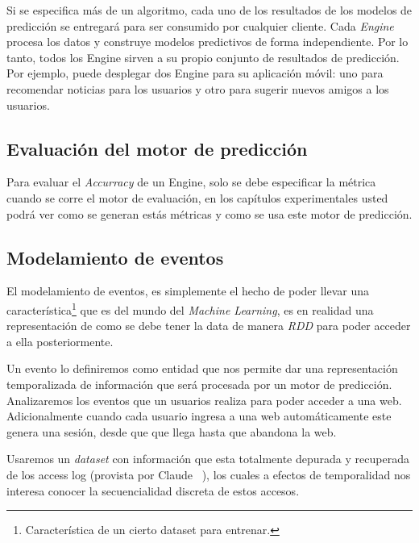   Si se especifica más de un algoritmo, cada uno de los resultados de los modelos de predicción se entregará para ser consumido por cualquier cliente.
  Cada \emph{Engine} procesa los datos y construye modelos predictivos de forma independiente. Por lo tanto, todos los Engine sirven a su propio conjunto de resultados de predicción. Por ejemplo, puede desplegar dos Engine para su aplicación móvil: uno para recomendar noticias para los usuarios y otro para sugerir nuevos amigos a los usuarios.


\vspace{1cm}
\subsection{Evaluación del motor de predicción }

  Para evaluar el \emph{Accurracy} de un {Engine}, solo se debe especificar la métrica cuando se corre el motor de evaluación, en los capítulos experimentales usted podrá ver como se generan estás métricas y como se usa este motor de predicción.











\subsection{Modelamiento de eventos}





  El modelamiento de eventos, es simplemente el hecho de poder llevar una característica\footnote{Característica de un cierto dataset para entrenar.}   que es del mundo del \emph{Machine Learning}, es en realidad una representación de como se debe tener la data de manera \emph{RDD} para poder acceder a ella posteriormente. 

  Un evento lo definiremos como entidad que nos permite dar una representación temporalizada de información que será procesada por un motor de predicción. Analizaremos los eventos que un usuarios realiza para poder acceder a una web. Adicionalmente cuando cada usuario ingresa a una web automáticamente este genera una sesión, desde que que llega hasta que abandona la web.

  Usaremos un \emph{dataset} con información que esta totalmente depurada y recuperada de los access log (provista por Claude \etal~\cite{Claude2014}), los cuales a efectos de temporalidad nos interesa conocer la secuencialidad discreta de estos accesos.
  


